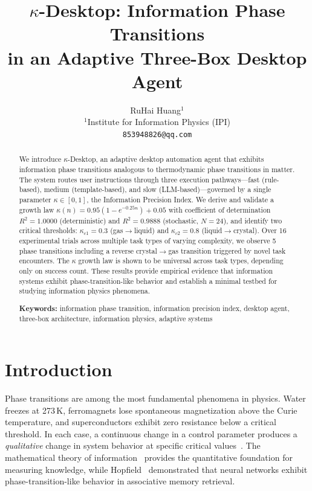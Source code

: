\documentclass[10pt,twocolumn]{article}
\title{%
  \Large $\kappa$-Desktop: Information Phase Transitions \\
  in an Adaptive Three-Box Desktop Agent
}
\author{
  RuHai Huang$^{1}$ \\[4pt]
  {\small $^{1}$Institute for Information Physics (IPI)} \\
  {\small \texttt{853948826@qq.com}}
}
\date{}
\newcommand{\kap}{\kappa}
\newcommand{\kdes}{$\kappa$-Desktop}
\begin{document}
\maketitle
\thispagestyle{empty}

\begin{abstract}
\noindent
We introduce \kdes{}, an adaptive desktop automation agent 
that exhibits information phase transitions analogous to 
thermodynamic phase transitions in matter. The system routes 
user instructions through three execution pathways---fast 
(rule-based), medium (template-based), and slow 
(LLM-based)---governed by a single parameter 
$\kap \in [0,1]$, the Information Precision Index. We derive 
 and validate a growth law $\kap(n) = 0.95(1-e^{-0.25n}) + 0.05$ 
 with coefficient of determination $R^2 = 1.0000$ 
 (deterministic) and $R^2 = 0.9888$ (stochastic, 
 $N=24$), and identify 
 two critical thresholds: $\kap_{c1} = 0.3$ 
 (gas$\rightarrow$liquid) and $\kap_{c2} = 0.8$ 
 (liquid$\rightarrow$crystal). Over 16 experimental trials 
across multiple task types of varying complexity, we observe 
5 phase transitions including a reverse 
crystal$\rightarrow$gas transition triggered by novel task 
encounters. The $\kap$ growth law is shown to be universal 
across task types, depending only on success count. These 
results provide empirical evidence that information systems 
exhibit phase-transition-like behavior and establish a minimal 
testbed for studying information physics phenomena.

\medskip
\noindent\textbf{Keywords:} information phase transition, 
information precision index, desktop agent, three-box 
architecture, information physics, adaptive systems
\end{abstract}

\section{Introduction}

Phase transitions are among the most fundamental phenomena 
in physics. Water freezes at 273\,K, ferromagnets lose 
spontaneous magnetization above the Curie temperature, and 
superconductors exhibit zero resistance below a critical 
threshold. In each case, a continuous change in a control 
parameter produces a \textit{qualitative} change in system 
behavior at specific critical values~\cite{landau1937, 
goldenfeld1992}. The mathematical theory of information~\cite{shannon1948} 
provides the quantitative foundation for measuring knowledge, 
while Hopfield~\cite{hopfield1982} demonstrated that neural 
networks exhibit phase-transition-like behavior in 
associative memory retrieval.
\end{document}
